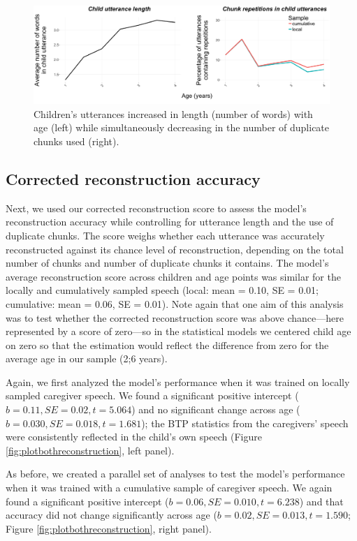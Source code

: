 \documentclass{article}
\begin{document}
\begin{figure}
\centering
\includegraphics[width=\textwidth]{images/plotbothfactors.png} \caption{Children's utterances increased in length (number of words) with age (left) while simultaneously decreasing in the number of duplicate chunks used (right).}
\label{fig:plotagefactors}
\end{figure}

\subsection{Corrected reconstruction accuracy}

Next, we used our corrected reconstruction score to assess the model's reconstruction accuracy while controlling for utterance length and the use of duplicate chunks. The score weighs whether each utterance was accurately reconstructed against its chance level of reconstruction, depending on the total number of chunks and number of duplicate chunks it contains. The model's average reconstruction score across children and age points was similar for the locally and cumulatively sampled speech (local: mean = 0.10, SE = 0.01; cumulative: mean = 0.06, SE = 0.01). Note again that one aim of this analysis was to test whether the corrected reconstruction score was above chance---here represented by a score of zero---so in the statistical models we centered child age on zero so that the estimation would reflect the difference from zero for the average age in our sample (2;6 years).

Again, we first analyzed the model's performance when it was trained on locally sampled caregiver speech. We found a significant positive intercept ($b = 0.11, SE = 0.02, t = 5.064$) and no significant change across age ($b = 0.030, SE = 0.018, t = 1.681$); the BTP statistics from the caregivers' speech were consistently reflected in the child's own speech (Figure \ref{fig:plotbothreconstruction}, left panel).

As before, we created a parallel set of analyses to test the model's performance when it was trained with a cumulative sample of caregiver speech. We again found a significant positive intercept ($b= 0.06, SE = 0.010, t = 6.238$) and that accuracy did not change significantly across age ($b=0.02, SE = 0.013, t = 1.590$; Figure \ref{fig:plotbothreconstruction}, right panel).
\end{document}
